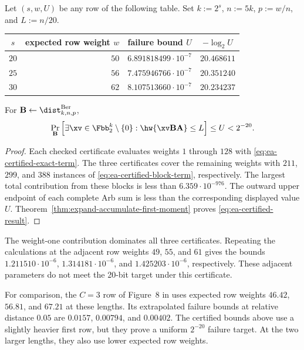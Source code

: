 \begin{theorem}
\label{thm:ea-certified-concrete}
Let $(s,w,U)$ be any row of the following table.  Set
$k:=2^s$, $n:=5k$, $p:=w/n$, and $L:=n/20$.
\begin{center}
\begin{tabular}{c|r|c|c}
$s$ & expected row weight $w$ & failure bound $U$ & $-\log_2 U$\\
\hline
$20$ & $50$ & $6.891818499\cdot10^{-7}$ & $20.468611$\\
$25$ & $56$ & $7.475946766\cdot10^{-7}$ & $20.351240$\\
$30$ & $62$ & $8.107513660\cdot10^{-7}$ & $20.234237$
\end{tabular}
\end{center}
For $\B\gets\dist^{\mathrm{Ber}}_{k,n,p}$,
\begin{equation}
 \Pr_{\B}\left[
   \exists\xv\in\Fbb_2^k\setminus\{0\}:
   \hw{\xv\B\A}\leq L
 \right]
 \leq U<2^{-20}.
 \label{eq:ea-certified-result}
\end{equation}
\end{theorem}

\begin{proof}
Each checked certificate evaluates weights $1$ through $128$ with
\eqref{eq:ea-certified-exact-term}.  The three certificates cover the
remaining weights with $211$, $299$, and $388$ instances of
\eqref{eq:ea-certified-block-term}, respectively.  The largest total
contribution from these blocks is less than
$6.359\cdot10^{-976}$.  The outward upper endpoint of each complete Arb sum
is less than the corresponding displayed value $U$.
Theorem~\ref{thm:expand-accumulate-first-moment} proves
\eqref{eq:ea-certified-result}.
\end{proof}

The weight-one contribution dominates all three certificates.  Repeating the
calculations at the adjacent row weights $49$, $55$, and $61$ gives the bounds
$1.211510\cdot10^{-6}$, $1.314181\cdot10^{-6}$, and
$1.425203\cdot10^{-6}$, respectively.  These adjacent parameters do not meet
the 20-bit target under this certificate.

For comparison, the $C=3$ row of Figure~8 in \cite{EA} uses expected row
weights $46.42$, $56.81$, and $67.21$ at these lengths.  Its extrapolated
failure bounds at relative distance $0.05$ are $0.0157$, $0.00794$, and
$0.00402$.  The certified bounds above use a slightly heavier first row, but
they prove a uniform $2^{-20}$ failure target.  At the two larger lengths,
they also use lower expected row weights.

